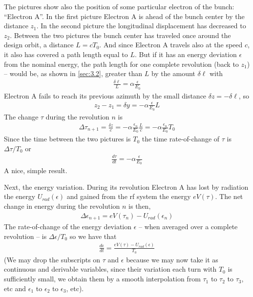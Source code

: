 The pictures show also the position of some particular electron of the bunch: “Electron A”. In the first picture Electron A is ahead of the bunch center by the distance $z_1$. In the second picture the longitudinal displacement has decreased to $z_2$. Between the two pictures the bunch center has traveled once around the design orbit, a distance $L=cT_0$. And since Electron A travels also at the speed $c$, it also has covered a path length equal to $L$. But if it has an energy deviation $\epsilon$ from the nominal energy, the path length for one complete revolution (back to $z_1$) -- would be, as shown in \autoref{sec:3.2}, greater than $L$ by the amount $\delta \ell$ with
\begin{align}
	\frac{\delta \ell}{L} = \alpha\frac{\epsilon}{E_0}
\end{align}
Electron A fails to reach its previous azimuth by the small distance $\delta z = -\delta \ell$, so
\begin{align}
	z_2 - z_1 = \delta y = -\alpha \frac{\epsilon}{E_0}L
\end{align}
The change $\tau$ during the revolution $n$ is
\begin{align}
	\Delta \tau_{n+1} = \frac{\delta z}{c} = -\alpha \frac{\epsilon_n}{E_0}\frac{L}{c} = -\alpha\frac{\epsilon_n}{E_0}T_0
\end{align}
Since the time between the two pictures is $T_0$ the time rate-of-change of $\tau$ is $\Delta \tau/T_0$ or
\begin{align}
	\frac{d \tau}{dt} = -\alpha \frac{\epsilon}{E_0}\label{eq:3.32}
\end{align}
A nice, simple result.

Next, the energy variation. During its revolution Electron A has lost by radiation the energy $U_{rad}(\epsilon)$ and gained from the rf system the energy $eV(\tau)$. The net change in energy during the revolution $n$ is then,
\begin{align}
	\Delta \epsilon_{n+1} = eV(\tau_n)-U_{rad}(\epsilon_n)
\end{align}
The rate-of-change of the energy deviation $\epsilon$ -- when averaged over a complete revolution -- is $\Delta \epsilon/T_0$ so we have that
\begin{align}
	\frac{d\epsilon}{dt} = \frac{eV(\tau)-U_{rad}(\epsilon)}{T_0}\label{eq:3.34}
\end{align}
(We may drop the subscripts on $\tau$ and $\epsilon$ because we may now take it as continuous and derivable variables, since their variation each turn with $T_0$ is sufficiently small, we obtain them by a smooth interpolation from $\tau_1$ to $\tau_2$ to $\tau_3$, etc and $\epsilon_1$ to $\epsilon_2$ to $\epsilon_3$, etc).


